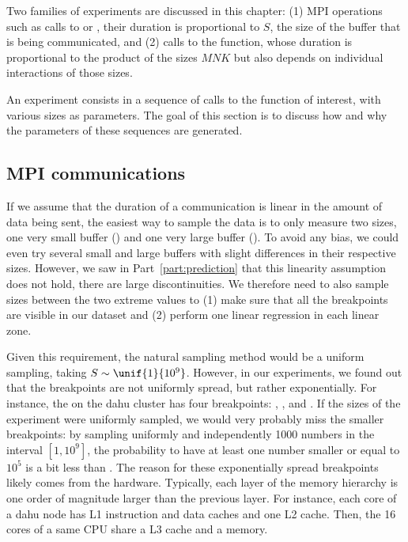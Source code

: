         Two families of experiments are discussed in this chapter: (1) MPI operations such as calls to
        \recv or \send, their duration is proportional to \(S\), the size of the buffer that is
        being communicated, and (2) calls to the \dgemm function, whose duration is proportional to the product
        of the sizes \(MNK\) but also depends on individual interactions of those sizes.

        An experiment consists in a sequence of calls to the function of interest, with various sizes as parameters. The
        goal of this section is to discuss how and why the parameters of these sequences are generated.

        \subsection{MPI communications}%

            If we assume that the duration of a communication is linear in the amount of data being sent, the easiest
            way to sample the data is to only measure two sizes, one very small buffer (\eg {}) and one very
            large buffer (\eg {}). To avoid any bias, we could even try several small and large
            buffers with slight differences in their respective sizes. However, we saw in Part~\ref{part:prediction}
            that this linearity assumption does not hold, there are large discontinuities. We therefore need to also
            sample sizes between the two extreme values to (1) make sure that all the breakpoints are visible in our
            dataset and (2) perform one linear regression in each linear zone.

            Given this requirement, the natural sampling method would be a uniform sampling, taking
            \(S\sim\unif{1}{10^9}\). However, in our experiments, we found out that the breakpoints are not uniformly
            spread, but rather exponentially. For instance, the \send on the dahu cluster has four
            breakpoints: , ,  and
            . If the sizes of the experiment were uniformly sampled, we would very probably miss
            the smaller breakpoints: by sampling uniformly and independently 1000 numbers in the interval \([1, 10^9]\),
            the probability to have at least one number smaller or equal to \(10^5\) is a bit less than
            . The reason for these exponentially spread breakpoints likely comes from the hardware.
            Typically, each layer of the memory hierarchy is one order of magnitude larger than the previous layer. For
            instance, each core of a dahu node has  L1 instruction and data caches and one
             L2 cache. Then, the 16 cores of a same CPU share a  L3 cache and
            a  memory.

